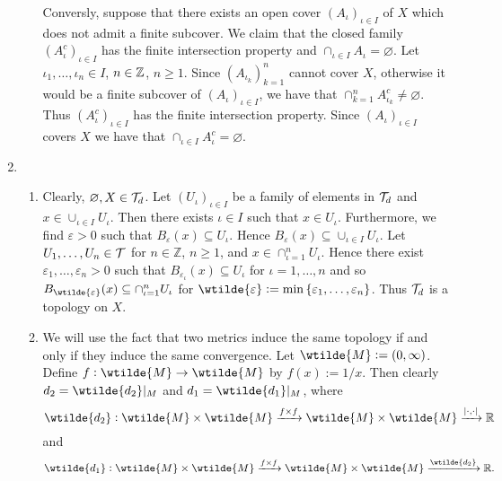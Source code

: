 \begin{enumerate}[label = \textbf{Exercise \arabic*.},wide = 0pt, itemsep=1.5ex]
\begin{enumerate}[label = \textbf{\alph*.},wide = 0pt, itemsep=1.5ex]
			Conversly, suppose that there exists an open cover $(A_\iota)_{\iota \in I}$ of $X$ which does not admit a finite subcover. We claim that the closed family $(A_\iota^c)_{\iota \in I}$ has the finite intersection property and $\cap_{\iota \in I}A_\iota = \varnothing$. Let $\iota_1,\dots,\iota_n \in I$, $n \in \mathbb{Z}$, $n \geq 1$. Since $(A_{\iota_k})_{k = 1}^n$ cannot cover $X$, otherwise it would be a finite subcover of $(A_\iota)_{\iota \in I}$, we have that $\cap_{k = 1}^n A_{\iota_k}^c \neq \varnothing$. Thus $(A_\iota^c)_{\iota \in I}$ has the finite intersection property. Since $(A_\iota)_{\iota \in I}$ covers $X$ we have that $\cap_{\iota \in I} A_\iota^c = \varnothing$.
	\end{enumerate}
\item
	~
	\begin{enumerate}[label = \textbf{\alph*.},wide = 0pt, itemsep=1.5ex]
		\item Clearly, $\varnothing,X \in \mathcal{T}_d$. Let $(U_\iota)_{\iota \in I}$ be a family of elements in $\mathcal{T}_d$ and $x \in \cup_{\iota \in I}U_\iota$. Then there exists $\iota \in I$ such that $x \in U_\iota$. Furthermore, we find $\varepsilon > 0$ such that $B_\varepsilon(x) \subseteq U_\iota$. Hence $B_\varepsilon(x) \subseteq \cup_{\iota \in I} U_\iota$. Let $U_1,\dots,U_n \in \mathcal{T}$ for $n\in \mathbb{Z}$, $n \geq 1$, and $x \in \cap_{\iota = 1}^n U_\iota$. Hence there exist $\varepsilon_1,\dots,\varepsilon_n > 0$ such that $B_{\varepsilon_\iota}(x) \subseteq U_\iota$ for $\iota = 1,\dots,n$ and so $B_{\wtilde{\varepsilon}}(x) \subseteq \cap_{\iota = 1}^n U_\iota$ for $\wtilde{\varepsilon} := \min\cbr[0]{\varepsilon_1,\dots,\varepsilon_n}$. Thus $\mathcal{T}_d$ is a topology on $X$. 
		\item We will use the fact that two metrics induce the same topology if and only if they induce the same convergence. Let $\wtilde{M} := \intoo{0,\infty}$. Define $f : \wtilde{M} \to \wtilde{M}$ by $f(x) := 1/x$. Then clearly $d_2 = \wtilde{d_2}\vert_M$ and $d_1 = \wtilde{d_1}\vert_M$, where 
		\begin{equation*}
			\wtilde{d_2} : \wtilde{M} \times \wtilde{M} \xrightarrow{f \times f}{} \wtilde{M} \times \wtilde{M} \xrightarrow{\abs[0]{\cdot,\cdot}}{} \Rbb
		\end{equation*}
		\noindent and
		\begin{equation*}
			\wtilde{d_1} : \wtilde{M} \times \wtilde{M} \xrightarrow{f \times f}{} \wtilde{M} \times \wtilde{M} \xrightarrow{\wtilde{d_2}}{} \Rbb.
		\end{equation*}

\end{enumerate}
\end{enumerate}
